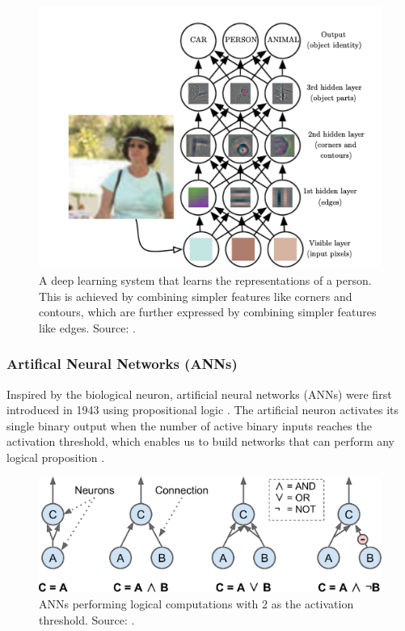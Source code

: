 \documentclass[a4paper, 11pt, oneside]{article}
\begin{document}
  \begin{figure}[ht]
    \begin{center}
      \includegraphics[width=.8\textwidth]{deep_learning.png}
    \end{center}
    \caption{A deep learning system that learns the representations of a person. This is achieved by combining simpler
    features like corners and contours, which are further expressed by combining simpler features like edges. Source:
    \cite{goodfellow2016deep}.}
  \end{figure}

  \subsubsection{Artifical Neural Networks (ANNs)}

  Inspired by the biological neuron, artificial neural networks (ANNs) were first introduced in 1943 using propositional
  logic \cite{mcculloch1943logical}. The artificial neuron activates its single binary output when the number of active
  binary inputs reaches the activation threshold, which enables us to build networks that can perform any logical
  proposition \cite{geron2019hands, mcculloch1943logical}.

  \begin{figure}[ht]
    \begin{center}
      \includegraphics[width=.5\textwidth]{ann_logic_computations.png}
    \end{center}
    \caption{ANNs performing logical computations with 2 as the activation threshold. Source: \cite{geron2019hands}.}
  \end{figure}
\end{document}
